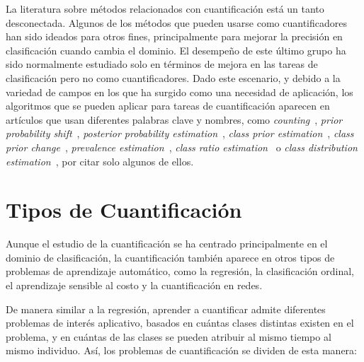 La literatura sobre métodos relacionados con cuantificación está un tanto
desconectada. Algunos de los métodos que pueden usarse como cuantificadores han
sido ideados para otros fines, principalmente para mejorar la precisión en
clasificación cuando cambia el dominio. El desempeño de este último grupo ha
sido normalmente estudiado solo en términos de mejora en las tareas de
clasificación pero no como cuantificadores. Dado este escenario, y debido a la
variedad de campos en los que ha surgido como una necesidad de aplicación, los
algoritmos que se pueden aplicar para tareas de cuantificación aparecen en
artículos que usan diferentes palabras clave y nombres, como {\it
counting\/}~\cite{lewis1995evaluating}, {\it prior probability
shift\/}~\cite{moreno2012unifying, storkey2009training}, {\it posterior
probability estimation\/}~\cite{alaiz2011class}, {\it class prior
estimation\/}~\cite{du2014class, chan2006estimating, zhang2010transfer}, {\it
class prior change\/}~\cite{du2014semi}, {\it prevalence
estimation\/}~\cite{barranquero2013study}, {\it class ratio
estimation\/}~\cite{asoh2012fast} o {\it class distribution
estimation\/}~\cite{gonzalez2013class, limsetto2011handling,
xue2009quantification}, por citar solo algunos de ellos.

\section{Tipos de Cuantificación}\label{problema:tipos}

Aunque el estudio de la cuantificación se ha centrado principalmente en el
dominio de clasificación, la cuantificación también aparece en otros tipos de
problemas de aprendizaje automático, como la regresión, la clasificación
ordinal, el aprendizaje sensible al costo y la cuantificación en redes.

De manera similar a la regresión, aprender a cuantificar admite diferentes
problemas de interés aplicativo, basados en cuántas clases distintas existen en
el problema, y en cuántas de las clases se pueden atribuir al mismo tiempo al
mismo individuo. Así, los problemas de cuantificación se dividen de esta manera:

